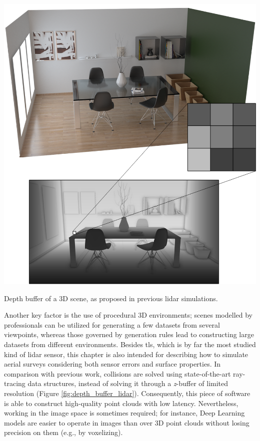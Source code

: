 \begin{marginfigure}[6cm]
    \centering
    \includegraphics[width=\linewidth]{figs/lidar_simulation/depth_buffer.png}
	\caption{Depth buffer of a 3D scene, as proposed in previous \acrshort{lidar} simulations. }
	\label{fig:depth_buffer_lidar}
\end{marginfigure}
Another key factor is the use of procedural 3D environments; scenes modelled by professionals can be utilized for generating a few datasets from several viewpoints, whereas those governed by generation rules lead to constructing large datasets from different environments. Besides \acrshort{tls}, which is by far the most studied kind of \acrshort{lidar} sensor, this chapter is also intended for describing how to simulate aerial surveys considering both sensor errors and surface properties. In comparison with previous work, collisions are solved using state-of-the-art ray-tracing data structures, instead of solving it through a \textit{z}-buffer of limited resolution (Figure \ref{fig:depth_buffer_lidar}). Consequently, this piece of software is able to construct high-quality point clouds with low latency. Nevertheless, working in the image space is sometimes required; for instance, Deep Learning models are easier to operate in images than over 3D point clouds without losing precision on them (e.g., by voxelizing).

